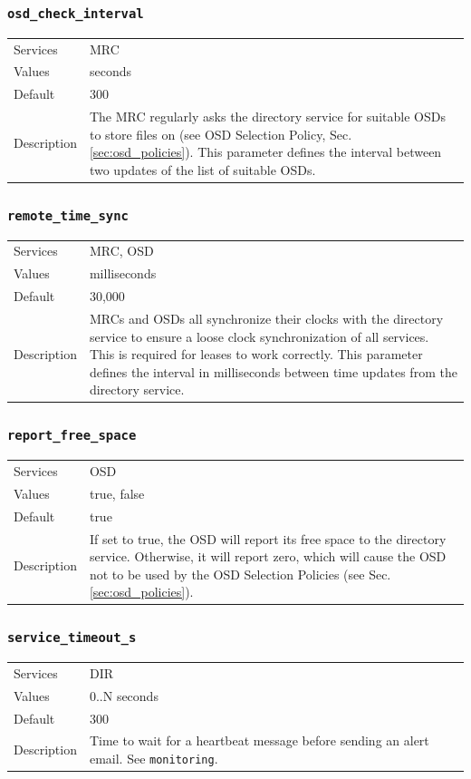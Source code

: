 \documentclass[a4paper,10pt]{book}
\begin{document}
\subsubsection{\texttt{osd\_check\_interval}}
\begin{tabular}{lp{10cm}}
 Services & MRC\\
 Values   & seconds \\
 Default  & 300\\
 Description & The MRC regularly asks the directory service for suitable OSDs to store files on (see OSD Selection Policy, Sec. \ref{sec:osd_policies}). This parameter defines the interval between two updates of the list of suitable OSDs.
\end{tabular}

\subsubsection{\texttt{remote\_time\_sync}}
\begin{tabular}{lp{10cm}}
 Services & MRC, OSD\\
 Values   & milliseconds \\
 Default  & 30,000\\
 Description & MRCs and OSDs all synchronize their clocks with the directory service to ensure a loose clock synchronization of all services. This is required for leases to work correctly. This parameter defines the interval in milliseconds between time updates from the directory service.
\end{tabular}

\subsubsection{\texttt{report\_free\_space}}
\begin{tabular}{lp{10cm}}
 Services & OSD\\
 Values   & true, false\\
 Default  & true\\
 Description & If set to true, the OSD will report its free space to the directory service. Otherwise, it will report zero, which will cause the OSD not to be used by the OSD Selection Policies (see Sec. \ref{sec:osd_policies}).
\end{tabular}

\subsubsection{\texttt{service\_timeout\_s}}
\begin{tabular}{lp{10cm}}
 Services & DIR\\
 Values   & 0..N seconds \\
 Default  & 300 \\
 Description & Time to wait for a heartbeat message before sending an alert email. See \texttt{monitoring}.
\end{tabular}
\end{document}
